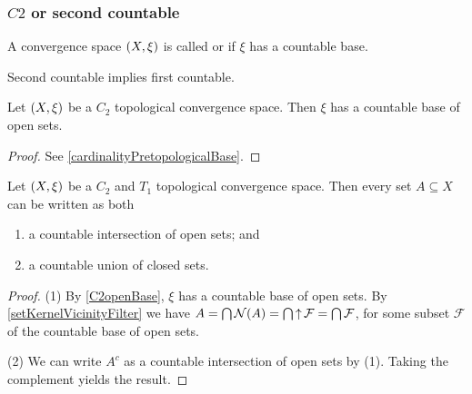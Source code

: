 \subsubsection{$C2$ or second countable}
\begin{definition}
A convergence space $\sSet{X, \xi}$ is called  or  if $\xi$ has a countable base.
\end{definition}

\begin{lemma}
Second countable implies first countable.
\end{lemma}

\begin{lemma} \label{C2openBase}
Let $\sSet{X,\xi}$ be a $C_2$ topological convergence space. Then $\xi$ has a countable base of open sets.
\end{lemma}
\begin{proof}
See \ref{cardinalityPretopologicalBase}.
\end{proof}

\begin{lemma} \label{AnySetCountableIntersectionOfOpenSets}
Let $\sSet{X,\xi}$ be a $C_2$ and $T_1$ topological convergence space. Then every set $A\subseteq X$ can be written as both
\begin{enumerate}
\item a countable intersection of open sets; and
\item a countable union of closed sets.
\end{enumerate}
\end{lemma}
\begin{proof}
(1) By \ref{C2openBase}, $\xi$ has a countable base of open sets. By \ref{setKernelVicinityFilter} we have $A = \bigcap \operatorname{\mathcal{N}}(A) = \bigcap \operatorname{\uparrow} \mathcal{F} = \bigcap \mathcal{F}$, for some subset $\mathcal{F}$ of the countable base of open sets.

(2) We can write $A^c$ as a countable intersection of open sets by (1). Taking the complement yields the result.
\end{proof}

